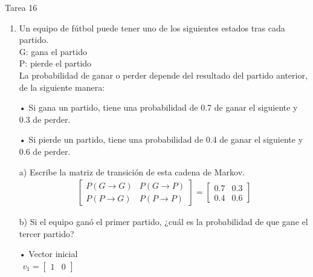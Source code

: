 \documentclass[a4paper, 12pt]{article}
\newcommand{\Aspace}{0.2cm}
\begin{document}
    \begin{center}
        { \LARGE Tarea 16}
    \end{center}

    \begin{enumerate}
        \item Un equipo de fútbol puede tener uno de los siguientes estados tras cada partido. 
        \\G: gana el partido
        \\P: pierde el partido
        \\La probabilidad de ganar o perder depende del resultado del partido anterior, de la siguiente manera: \par
        • Si gana un partido, tiene una probabilidad de 0.7 de ganar el siguiente y 0.3 de perder. \par
        • Si pierde un partido, tiene una probabilidad de 0.4 de ganar el siguiente y 0.6 de perder.
            \vspace{\Aspace} \par
            a) Escribe la matriz de transición de esta cadena de Markov.
            \\ { \color{azul} 
                \[
                    \begin{array}{ccc}
                        \begin{bmatrix}
                            P(G \rightarrow G)  &   P(G \rightarrow P)  \\
                            P(P \rightarrow G)  &   P(P \rightarrow P)  
                        \end{bmatrix}
                    
                        =
                    
                        \begin{bmatrix}
                            0{.}7   &   0{.}3   \\
                            0{.}4   &   0{.}6
                        \end{bmatrix}
                    \end{array}
                \]
            }

            \vspace{\Aspace} \par
            b) Si el equipo ganó el primer partido, ¿cuál es la probabilidad de que gane el tercer partido?
            \\ { \color{azul} 
                • Vector inicial \\
                \(
                    \begin{array}{ccc}
                        v_{1}   
                        =
                        \begin{bmatrix}
                            1   &   0
                        \end{bmatrix}
                    \end{array}
                \)

}
\end{enumerate}
\end{document}
